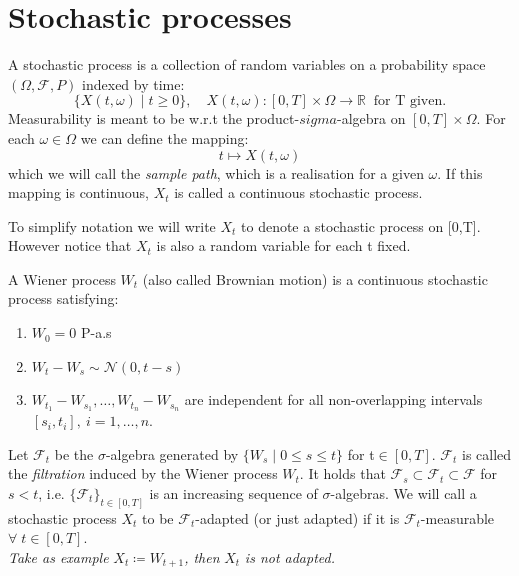\section{Stochastic processes}
\label{sec:}
\begin{samepage}
\begin{definition}
A stochastic process is a collection of random variables on a probability space \(\left( \Omega , \mathcal{F}, P\right)\)
indexed by time: 
\begin{displaymath}
\{X(t,\omega)\mid t\geq 0\}, \quad X(t,\omega)\!: [0,T]\times\Omega \rightarrow \mathbb{R}\;\;\text{for T given.}
\end{displaymath}
Measurability is meant to be w.r.t the product-\(sigma\)-algebra on \([0,T]\times\Omega\).
For each \(\omega \in \Omega\) we can define the mapping:
\begin{displaymath}
t\mapsto X(t,\omega)
\end{displaymath}
which we will call the \emph{sample path}, which is a realisation for a given \(\omega\). If this mapping is continuous, \(X_t\) is called a continuous stochastic process. 
\end{definition}
To simplify notation we will write \(X_t\) to denote a stochastic process on [0,T]. However notice that \(X_t\) is also a random variable for each t fixed.
\begin{definition}
A Wiener process \(W_t\) (also called Brownian motion) is a continuous stochastic process satisfying:
\begin{enumerate}[noitemsep,topsep=0mm,labelindent=6mm,leftmargin=*,widest=3.,align=right]
\item \(W_0 = 0\) P-a.s
\item \(W_t-W_s \sim \mathcal{N}(0,t-s)\)
\item \(W_{t_1}-W_{s_1},\dots,W_{t_n}-W_{s_n}\) are independent for all non-overlapping intervals \([s_i, t_i],\: i=1,\dots,n\).
\end{enumerate}
\end{definition}
\nopagebreak
\begin{definition}
Let \(\mathcal{F}_t\) be the \(\sigma\)-algebra generated by \(\{W_s\mid 0\leq s\leq t\}\) for t\;\(\in[0,T]\). \(\mathcal{F}_t\) is called the \emph{filtration} induced by the Wiener process \(W_t\).
It holds that \(\mathcal{F}_s\subset\mathcal{F}_t\subset\mathcal{F}\) for \(s<t\), i.e. \(\{\mathcal{F}_t\}_{t\in[0,T]}\) is an increasing sequence of \(\sigma\)-algebras.
We will call a stochastic process \(X_t\) to be \(\mathcal{F}_t\)-adapted (or just adapted) if it is \(\mathcal{F}_t\)-measurable \(\forall\; t\in[0,T].\)\\
\emph{Take as example} \(X_t\coloneqq W_{t+1}\)\emph{, then }\(X_t\)\emph{ is not adapted.}
\end{definition}
\end{samepage}
